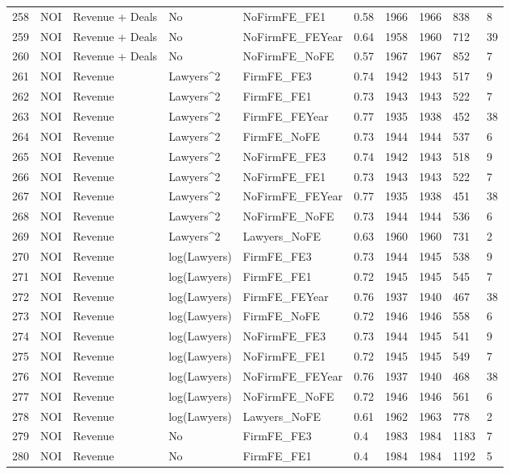 \documentclass{article}
\begin{document}
\begin{table}[H]
\begin{tabular}{rlllllllll}
  258 & NOI & Revenue + Deals & No & NoFirmFE\_FE1 & 0.58 & 1966 & 1966 & 838 & 8 \\ 
  259 & NOI & Revenue + Deals & No & NoFirmFE\_FEYear & 0.64 & 1958 & 1960 & 712 & 39 \\ 
  260 & NOI & Revenue + Deals & No & NoFirmFE\_NoFE & 0.57 & 1967 & 1967 & 852 & 7 \\ 
  261 & NOI & Revenue & Lawyers^2 & FirmFE\_FE3 & 0.74 & 1942 & 1943 & 517 & 9 \\ 
  262 & NOI & Revenue & Lawyers^2 & FirmFE\_FE1 & 0.73 & 1943 & 1943 & 522 & 7 \\ 
  263 & NOI & Revenue & Lawyers^2 & FirmFE\_FEYear & 0.77 & 1935 & 1938 & 452 & 38 \\ 
  264 & NOI & Revenue & Lawyers^2 & FirmFE\_NoFE & 0.73 & 1944 & 1944 & 537 & 6 \\ 
  265 & NOI & Revenue & Lawyers^2 & NoFirmFE\_FE3 & 0.74 & 1942 & 1943 & 518 & 9 \\ 
  266 & NOI & Revenue & Lawyers^2 & NoFirmFE\_FE1 & 0.73 & 1943 & 1943 & 522 & 7 \\ 
  267 & NOI & Revenue & Lawyers^2 & NoFirmFE\_FEYear & 0.77 & 1935 & 1938 & 451 & 38 \\ 
  268 & NOI & Revenue & Lawyers^2 & NoFirmFE\_NoFE & 0.73 & 1944 & 1944 & 536 & 6 \\ 
  269 & NOI & Revenue & Lawyers^2 & Lawyers\_NoFE & 0.63 & 1960 & 1960 & 731 & 2 \\ 
  270 & NOI & Revenue & log(Lawyers) & FirmFE\_FE3 & 0.73 & 1944 & 1945 & 538 & 9 \\ 
  271 & NOI & Revenue & log(Lawyers) & FirmFE\_FE1 & 0.72 & 1945 & 1945 & 545 & 7 \\ 
  272 & NOI & Revenue & log(Lawyers) & FirmFE\_FEYear & 0.76 & 1937 & 1940 & 467 & 38 \\ 
  273 & NOI & Revenue & log(Lawyers) & FirmFE\_NoFE & 0.72 & 1946 & 1946 & 558 & 6 \\ 
  274 & NOI & Revenue & log(Lawyers) & NoFirmFE\_FE3 & 0.73 & 1944 & 1945 & 541 & 9 \\ 
  275 & NOI & Revenue & log(Lawyers) & NoFirmFE\_FE1 & 0.72 & 1945 & 1945 & 549 & 7 \\ 
  276 & NOI & Revenue & log(Lawyers) & NoFirmFE\_FEYear & 0.76 & 1937 & 1940 & 468 & 38 \\ 
  277 & NOI & Revenue & log(Lawyers) & NoFirmFE\_NoFE & 0.72 & 1946 & 1946 & 561 & 6 \\ 
  278 & NOI & Revenue & log(Lawyers) & Lawyers\_NoFE & 0.61 & 1962 & 1963 & 778 & 2 \\ 
  279 & NOI & Revenue & No & FirmFE\_FE3 & 0.4 & 1983 & 1984 & 1183 & 7 \\ 
  280 & NOI & Revenue & No & FirmFE\_FE1 & 0.4 & 1984 & 1984 & 1192 & 5 \\ 
   \hline
\end{tabular}
\end{table}
\end{document}
